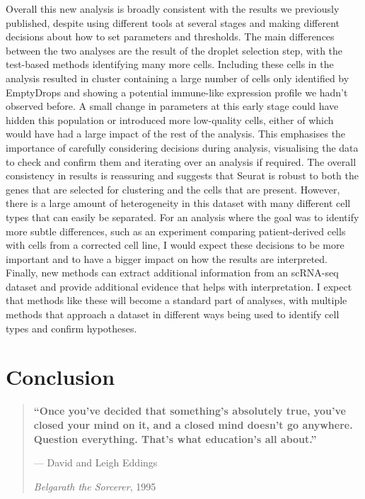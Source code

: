 \documentclass[11pt,a4paper,titlepage,twoside,openright]{style/unimelbthesis}
\theoremstyle{definition}
\theoremstyle{definition}
\theoremstyle{definition}
\theoremstyle{remark}
\begin{document}
\begin{mainmatter}
Overall this new analysis is broadly consistent with the results we previously published, despite using different tools at several stages and making different decisions about how to set parameters and thresholds. The main differences between the two analyses are the result of the droplet selection step, with the test-based methods identifying many more cells. Including these cells in the analysis resulted in cluster containing a large number of cells only identified by EmptyDrops and showing a potential immune-like expression profile we hadn't observed before. A small change in parameters at this early stage could have hidden this population or introduced more low-quality cells, either of which would have had a large impact of the rest of the analysis. This emphasises the importance of carefully considering decisions during analysis, visualising the data to check and confirm them and iterating over an analysis if required. The overall consistency in results is reassuring and suggests that Seurat is robust to both the genes that are selected for clustering and the cells that are present. However, there is a large amount of heterogeneity in this dataset with many different cell types that can easily be separated. For an analysis where the goal was to identify more subtle differences, such as an experiment comparing patient-derived cells with cells from a corrected cell line, I would expect these decisions to be more important and to have a bigger impact on how the results are interpreted. Finally, new methods can extract additional information from an scRNA-seq dataset and provide additional evidence that helps with interpretation. I expect that methods like these will become a standard part of analyses, with multiple methods that approach a dataset in different ways being used to identify cell types and confirm hypotheses.

\hypertarget{conclusion}{%
\chapter{Conclusion}\label{conclusion}}

\begin{quote}
\textbf{\enquote{Once you've decided that something's absolutely true, you've closed your mind on it, and a closed mind doesn't go anywhere. Question everything. That's what education's all about.}}

--- David and Leigh Eddings

\emph{Belgarath the Sorcerer}, 1995
\end{quote}


\end{mainmatter}
\end{document}

